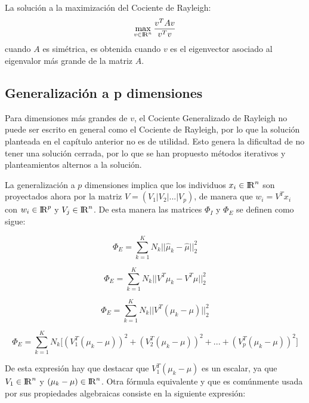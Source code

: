 \begin{proposition} \label{lemma2.2}
La solución a la maximización del Cociente de Rayleigh:
$$\max_{v \in {\rm I\!R}^{n} } \frac{v^T A v}{v^Tv} $$
cuando $A$ es simétrica, es obtenida cuando $v$ es el eigenvector asociado al eigenvalor más grande de la matriz $A$.
\end{proposition}


\subsection{Generalización a p dimensiones}

Para dimensiones más grandes de $v$, el Cociente Generalizado de Rayleigh no puede ser escrito en general como el Cociente de Rayleigh, por lo que la solución planteada en el capítulo anterior no es de utilidad. Esto genera la dificultad de no tener una solución cerrada, por lo que se han propuesto métodos iterativos y planteamientos alternos a la solución.

La generalización a $p$ dimensiones implica que los individuos $x_i \in {\rm I\!R}^{n}$ son proyectados ahora por la matriz $V = (V_1 | V_2 | ... |V_p)$, de manera que $w_i = V^T x_i$ con $w_i \in {\rm I\!R}^{p}$ y $V_j \in {\rm I\!R}^{n}$. De esta manera las matrices $\Phi_I$ y $\Phi_E$ se definen como sigue:

\begin{equation*}
\Phi_E = \sum\limits_{k = 1}^{K} N_{k} ||\widehat{\mu}_k - \widehat{\mu}||_2^2
\end{equation*}

\begin{equation*}
\Phi_E = \sum\limits_{k = 1}^{K} N_{k} ||V^T \mu_k - V^T \mu||_2^2
\end{equation*}

\begin{equation*}
\Phi_E = \sum\limits_{k = 1}^{K} N_{k} ||V^T (\mu_k - \mu)||_2^2
\end{equation*}


\begin{equation}\label{eq:2.17}
  \Phi_E = \sum\limits_{k = 1}^{K} N_{k} \big[ (V_1^T (\mu_k - \mu))^2 + (V_2^T (\mu_k - \mu))^2+ ... + (V_p^T (\mu_k - \mu))^2 \big]
\end{equation}

De esta expresión hay que destacar que $V_1^T (\mu_k - \mu)$ es un escalar, ya que $V_1 \in {\rm I\!R}^n$ y $(\mu_k - \mu) \in {\rm I\!R}^{n}$. Otra fórmula equivalente y que es comúnmente usada por sus propiedades algebraicas consiste en la siguiente expresión:

